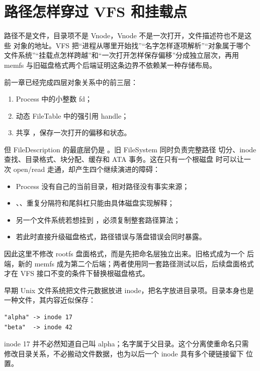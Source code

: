 \section{路径怎样穿过 VFS 和挂载点}

路径不是文件，目录项不是 Vnode，Vnode 不是一次打开，文件描述符也不是这些
对象的地址。VFS 把“进程从哪里开始找”“名字怎样逐项解析”“对象属于哪个
文件系统”“挂载点怎样跨越”和“一次打开怎样保存偏移”分成独立层次，再用
memfs 与旧磁盘格式两个后端证明这条边界不依赖某一种存储布局。

前一章已经完成四层对象关系中的前三层：

\begin{enumerate}
  \item Process 中的小整数 fd；
  \item 动态 FileTable 中的强引用 handle；
  \item 共享 ，保存一次打开的偏移和状态。
\end{enumerate}

但 FileDescription 的最底层仍是
。旧 FileSystem 同时负责完整路径
切分、inode 查找、目录格式、块分配、缓存和 ATA 事务。这在只有一个根磁盘
时可以让一次 open/read 走通，却产生四个继续演进的障碍：

\begin{itemize}
  \item Process 没有自己的当前目录，相对路径没有事实来源；
  \item {}、、重复分隔符和尾斜杠只能由具体磁盘实现解释；
  \item 另一个文件系统若想挂到 ，必须复制整套路径算法；
  \item 若此时直接升级磁盘格式，路径错误与落盘错误会同时暴露。
\end{itemize}

因此这里不修改 rootfs 盘面格式，而是先把命名层独立出来。旧格式成为一个
后端，新的 memfs 成为第二个后端；两者使用同一套路径测试以后，后续盘面格式才在 VFS
接口不变的条件下替换根磁盘格式。

早期 Unix 文件系统把文件元数据放进 inode，把名字放进目录项。目录本身也是
一种文件，其内容近似保存：

\begin{lstlisting}[caption={目录项表达的是父目录中的名字映射}]
"alpha" -> inode 17
"beta"  -> inode 42
\end{lstlisting}

inode 17 并不必然知道自己叫 alpha；名字属于父目录。这个分离使重命名只需
修改目录关系，不必搬动文件数据，也为以后一个 inode 具有多个硬链接留下
位置。

